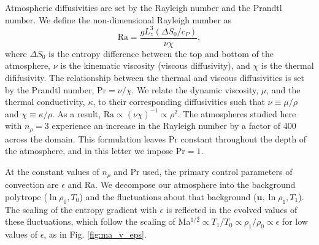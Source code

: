\documentclass[aps, prl, twocolumn, groupedaddress, amsfonts, amssymb, amsmath]{revtex4-1}
\begin{document}
Atmospheric diffusivities are set by the Rayleigh number and the Prandtl number.  We define the
non-dimensional Rayleigh number as
\begin{equation}
\text{Ra} = \frac{g L_z^3 (\Delta S_0 / c_P)}{\nu\chi},
\end{equation}
where $\Delta S_0$ is the entropy difference between the top and bottom of the atmosphere, 
$\nu$ is the kinematic viscosity (viscous diffusivity), and $\chi$ is the thermal dififusivity.  
The relationship between the thermal and viscous diffusivities is
set by the Prandtl number, Pr$ = \nu/\chi$.   We relate the dynamic viscosity, $\mu$, and the thermal conductivity,
$\kappa$, to their corresponding diffusivities such that 
$\nu \equiv \mu/\rho$ and $\chi \equiv \kappa/\rho$.  As a result, $\text{Ra} \propto (\nu\chi)^{-1} \propto
\rho^2$.  The atmospheres studied here with $n_{\rho} = 3$ experience an increase in the Rayleigh number 
by a factor of 400 across the domain.  This formulation leaves Pr
constant throughout the depth of the atmosphere, and in this letter we impose $\text{Pr} = 1$.

At the constant values of $n_\rho$ and Pr used, the primary control parameters of convection are $\epsilon$
and Ra.  We decompose our atmosphere into the background polytrope ($\ln\rho_{0}, T_{0}$) and the fluctuations
about that background ($\bm{u}, \ln\rho_{1}, T_{1}$).  The scaling of the entropy gradient with $\epsilon$
is reflected in the evolved values of these fluctuations, which follow the scaling of
Ma$^{1/2} \propto T_1/T_0 \propto \rho_{1}/\rho_{0} \propto \epsilon$ for low values of $\epsilon$,
as in Fig. \ref{fig:ma_v_eps}.
\end{document}
